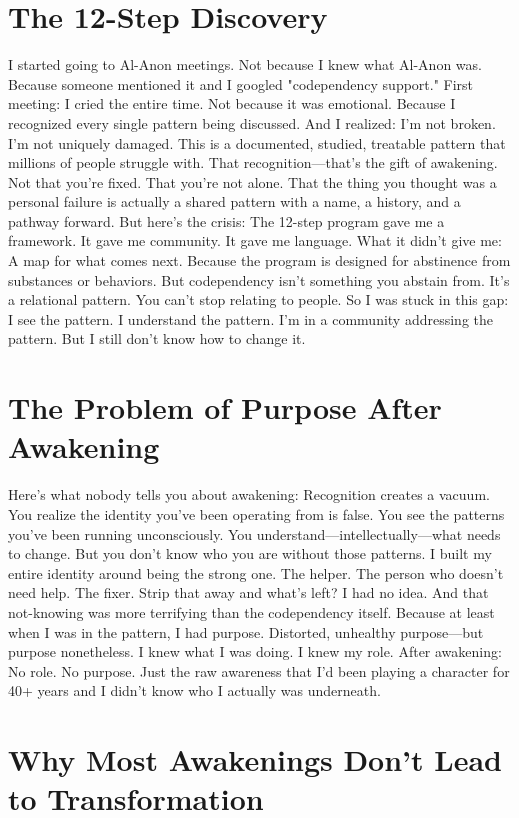 \documentclass[12pt,openany]{book}
\begin{document}
\section{The 12-Step Discovery}

I started going to Al-Anon meetings. Not because I knew what Al-Anon was. Because someone mentioned it and I googled "codependency support."
First meeting: I cried the entire time.
Not because it was emotional. Because I recognized every single pattern being discussed. And I realized: I'm not broken. I'm not uniquely damaged. This is a documented, studied, treatable pattern that millions of people struggle with.
That recognition—that's the gift of awakening.
Not that you're fixed. That you're not alone. That the thing you thought was a personal failure is actually a shared pattern with a name, a history, and a pathway forward.
But here's the crisis:
The 12-step program gave me a framework. It gave me community. It gave me language.
What it didn't give me: A map for what comes next.
Because the program is designed for abstinence from substances or behaviors. But codependency isn't something you abstain from. It's a relational pattern. You can't stop relating to people.
So I was stuck in this gap: I see the pattern. I understand the pattern. I'm in a community addressing the pattern. But I still don't know how to change it.

\section{The Problem of Purpose After Awakening}

Here's what nobody tells you about awakening:
Recognition creates a vacuum.
You realize the identity you've been operating from is false. You see the patterns you've been running unconsciously. You understand—intellectually—what needs to change.
But you don't know who you are without those patterns.
I built my entire identity around being the strong one. The helper. The person who doesn't need help. The fixer.
Strip that away and what's left?
I had no idea. And that not-knowing was more terrifying than the codependency itself.
Because at least when I was in the pattern, I had purpose. Distorted, unhealthy purpose—but purpose nonetheless. I knew what I was doing. I knew my role.
After awakening: No role. No purpose. Just the raw awareness that I'd been playing a character for 40+ years and I didn't know who I actually was underneath.

\section{Why Most Awakenings Don't Lead to Transformation}
\end{document}
